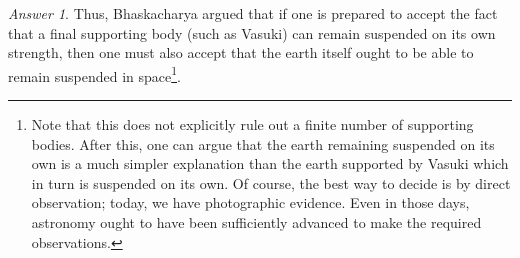 \documentclass[11pt]{article}
\theoremstyle{remark}
\newtheorem*{answer}{Answer}
\begin{document}
\begin{answer}
        Thus, Bhaskacharya argued that if one is prepared to accept the fact that a
        final supporting body (such as Vasuki) can remain suspended on its own
        strength, then one must also accept that the earth itself ought to be able to
        remain suspended in space\footnote{Note that this does not explicitly rule
        out a finite number of supporting bodies. After this, one can argue that the
        earth remaining suspended on its own is a much simpler explanation than the
        earth supported by Vasuki which in turn is suspended on its own. Of course,
        the best way to decide is by direct observation; today, we have photographic
        evidence. Even in those days, astronomy ought to have been sufficiently
        advanced to make the required observations.}.
    \end{answer}
    
\end{document}
